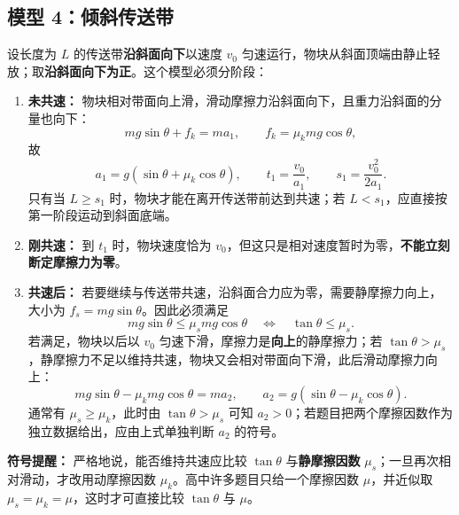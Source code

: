 \begin{center}


\label{fig:conveyor-belt}
\end{center}

\subsection*{模型 4：倾斜传送带}

设长度为 $L$ 的传送带\textbf{沿斜面向下}以速度 $v_0$ 匀速运行，物块从斜面顶端由静止轻放；取\textbf{沿斜面向下为正}。这个模型必须分阶段：
\begin{enumerate}
  \item \textbf{未共速：} 物块相对带面向上滑，滑动摩擦力沿斜面向下，且重力沿斜面的分量也向下：
\[
mg\sin\theta+f_k=ma_1,\qquad
f_k=\mu_kmg\cos\theta,
\]
故
\[
\boxed{a_1=g(\sin\theta+\mu_k\cos\theta)},\qquad
t_1=\frac{v_0}{a_1},\qquad
s_1=\frac{v_0^2}{2a_1}.
\]
只有当 $L\ge s_1$ 时，物块才能在离开传送带前达到共速；若
$L<s_1$，应直接按第一阶段运动到斜面底端。
  \item \textbf{刚共速：} 到 $t_1$ 时，物块速度恰为 $v_0$，但这只是相对速度暂时为零，\textbf{不能立刻断定摩擦力为零}。
  \item \textbf{共速后：} 若要继续与传送带共速，沿斜面合力应为零，需要静摩擦力向上，大小为 $f_s=mg\sin\theta$。因此必须满足
\[
mg\sin\theta\leq\mu_smg\cos\theta
\quad\Longleftrightarrow\quad
\boxed{\tan\theta\leq\mu_s}.
\]
若满足，物块以后以 $v_0$ 匀速下滑，摩擦力是\textbf{向上}的静摩擦力；若 $\tan\theta>\mu_s$，静摩擦力不足以维持共速，物块又会相对带面向下滑，此后滑动摩擦力向上：
\[
mg\sin\theta-\mu_kmg\cos\theta=ma_2,\qquad
\boxed{a_2=g(\sin\theta-\mu_k\cos\theta)}.
\]
通常有 $\mu_s\ge\mu_k$，此时由 $\tan\theta>\mu_s$ 可知 $a_2>0$；若题目把两个摩擦因数作为独立数据给出，应由上式单独判断 $a_2$ 的符号。
\end{enumerate}

\textbf{符号提醒：} 严格地说，能否维持共速应比较 $\tan\theta$ 与\textbf{静摩擦因数} $\mu_s$；一旦再次相对滑动，才改用动摩擦因数 $\mu_k$。高中许多题目只给一个摩擦因数 $\mu$，并近似取 $\mu_s=\mu_k=\mu$，这时才可直接比较 $\tan\theta$ 与 $\mu$。

\begin{center}


\label{fig:inclined-conveyor-belt}
\end{center}

